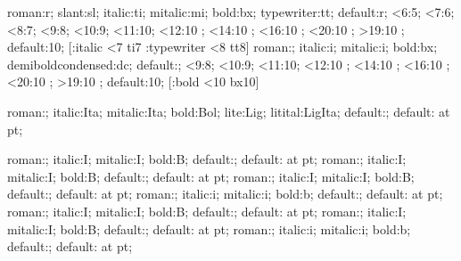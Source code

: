 %
%
%
%
%
%
%
    {roman:r; slant:sl; italic:ti; mitalic:mi; bold:bx; typewriter:tt;
     default:r;}%
    {<6:5; <7:6; <8:7; <9:8; <10:9; <11:10; <12:10 \sc@led\magstephalf;
     <14:10 \sc@led{}; <16:10 \sc@led{};
     <20:10 \sc@led{}; >19:10 \sc@led{};
     default:10;}%
    [\ifStyle:italic \ifnum\Fsize<7 ti7\fi\fi
     \ifStyle:typewriter \ifnum\Fsize<8 tt8\fi\fi]
%
    {roman:; italic:i; mitalic:i; bold:bx; demiboldcondensed:dc;
     default:;}%
    {<9:8; <10:9; <11:10; <12:10 \sc@led\magstephalf;
     <14:10 \sc@led{}; <16:10 \sc@led{};
     <20:10 \sc@led{}; >19:10 \sc@led{};
     default:10;}%
    [\ifStyle:bold \ifnum\Fsize<10 bx10\fi\fi]

 {roman:; italic:Ita; mitalic:Ita; bold:Bol; 
  lite:Lig; litital:LigIta; default:;}
 {default: at \Fsize pt;}

    {roman:; italic:I; mitalic:I; bold:B; default:;}
    {default: at \Fsize pt;}
    {roman:; italic:I; mitalic:I; bold:B; default:;}
    {default: at \Fsize pt;}
    {roman:; italic:I; mitalic:I; bold:B; default:;}
    {default: at \Fsize pt;}
    {roman:; italic:i; mitalic:i; bold:b; default:;}
    {default: at \Fsize pt;}
    {roman:; italic:I; mitalic:I; bold:B; default:;}
    {default: at \Fsize pt;}
    {roman:; italic:I; mitalic:I; bold:B; default:;}
    {default: at \Fsize pt;}
    {roman:; italic:i; mitalic:i; bold:b; default:;}
    {default: at \Fsize pt;}

\endinput
